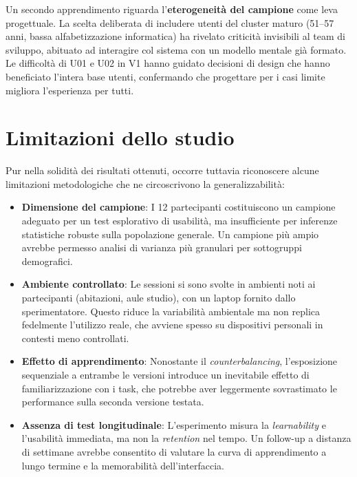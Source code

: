 Un secondo apprendimento riguarda l'\textbf{eterogeneità del campione} come leva progettuale. La scelta deliberata di includere utenti del cluster maturo (51--57 anni, bassa alfabetizzazione informatica) ha rivelato criticità invisibili al team di sviluppo, abituato ad interagire col sistema con un modello mentale già formato. Le difficoltà di U01 e U02 in V1 hanno guidato decisioni di design che hanno beneficiato l'intera base utenti, confermando che progettare per i casi limite migliora l'esperienza per tutti.

\section{Limitazioni dello studio}

Pur nella solidità dei risultati ottenuti, occorre tuttavia riconoscere alcune limitazioni metodologiche che ne circoscrivono la generalizzabilità:

\begin{itemize}
    \item \textbf{Dimensione del campione}: I 12 partecipanti costituiscono un campione adeguato per un test esplorativo di usabilità, ma insufficiente per inferenze statistiche robuste sulla popolazione generale. Un campione più ampio avrebbe permesso analisi di varianza più granulari per sottogruppi demografici.

    \item \textbf{Ambiente controllato}: Le sessioni si sono svolte in ambienti noti ai partecipanti (abitazioni, aule studio), con un laptop fornito dallo sperimentatore. Questo riduce la variabilità ambientale ma non replica fedelmente l'utilizzo reale, che avviene spesso su dispositivi personali in contesti meno controllati.

    \item \textbf{Effetto di apprendimento}: Nonostante il \textit{counterbalancing}, l'esposizione sequenziale a entrambe le versioni introduce un inevitabile effetto di familiarizzazione con i task, che potrebbe aver leggermente sovrastimato le performance sulla seconda versione testata.

    \item \textbf{Assenza di test longitudinale}: L'esperimento misura la \textit{learnability} e l'usabilità immediata, ma non la \textit{retention} nel tempo. Un follow-up a distanza di settimane avrebbe consentito di valutare la curva di apprendimento a lungo termine e la memorabilità dell'interfaccia.
\end{itemize}

